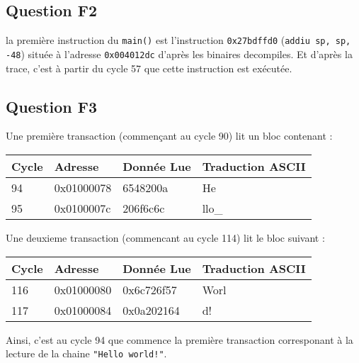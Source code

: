 \documentclass{article}
\begin{document}
\subsection{Question F2}

la première instruction du \texttt{main()} est l'instruction \texttt{0x27bdffd0}
(\texttt{addiu sp, sp, -48}) située à l'adresse \texttt{0x004012dc} d'après les binaires
decompiles.
Et d'après la trace, c'est à partir du cycle 57 que cette instruction
est exécutée.

\subsection{Question F3}

Une première transaction (commençant au cycle 90) lit un bloc contenant :
\begin{table}[H]
\centering
\begingroup
\setlength{\tabcolsep}{5pt}
\renewcommand{\arraystretch}{1.1}
\begin{tabular}{| l | l | l | l |}
\hline
Cycle	& Adresse	& Donnée Lue	& Traduction ASCII \\
\hline
94	& 0x01000078	& 6548200a	& He \\
\hline
95	& 0x0100007c	& 206f6c6c	& llo\_ \\
\hline
\end{tabular}
\endgroup
\end{table}


Une deuxieme transaction (commencant au cycle 114) lit le bloc suivant :
\begin{table}[H]
\centering
\begingroup
\setlength{\tabcolsep}{5pt}
\renewcommand{\arraystretch}{1.1}
\begin{tabular}{| l | l | l | l|}
\hline
Cycle	& Adresse	& Donnée Lue	& Traduction ASCII \\
\hline
116	& 0x01000080	& 0x6c726f57	& Worl \\
117	& 0x01000084	& 0x0a202164	& d! \\
\hline
\end{tabular}
\endgroup
\end{table}

Ainsi, c'est au cycle 94 que commence la première transaction corresponant
à la lecture de la chaine \texttt{"Hello world!"}.

\end{document}
